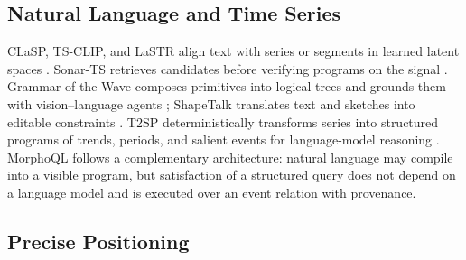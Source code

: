 \subsection{Natural Language and Time Series}

CLaSP, TS-CLIP, and LaSTR align text with series or segments in learned latent spaces \cite{ito2024,chen2025,dohi2026}. Sonar-TS retrieves candidates before verifying programs on the signal \cite{tan2026}. Grammar of the Wave composes primitives into logical trees and grounds them with vision--language agents \cite{wan2026}; ShapeTalk translates text and sketches into editable constraints \cite{sun2026}. T2SP deterministically transforms series into structured programs of trends, periods, and salient events for language-model reasoning \cite{kim2026}. MorphoQL follows a complementary architecture: natural language may compile into a visible program, but satisfaction of a structured query does not depend on a language model and is executed over an event relation with provenance.

\subsection{Precise Positioning}

